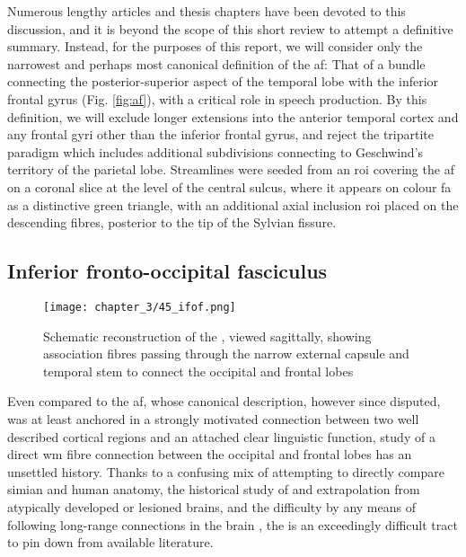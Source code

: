 Numerous lengthy articles and thesis chapters have been devoted to this discussion, and it is beyond the scope of this short review to attempt a definitive summary.
Instead, for the purposes of this report, we will consider only the narrowest and perhaps most canonical definition of the \gls{af}:
That of a bundle connecting the posterior-superior aspect of the temporal lobe with the inferior frontal gyrus (Fig. \ref{fig:af}), with a critical role in speech production\autocite{Baldo2015}.
By this definition, we will exclude longer extensions into the anterior temporal cortex\autocite{Giampiccolo2022a} and any frontal gyri other than the inferior frontal gyrus, and reject the tripartite paradigm which includes additional subdivisions connecting to Geschwind's territory of the parietal lobe\autocite{Catani2005,Martino2013a}.
Streamlines were seeded from an \gls{roi} covering the \gls{af} on a coronal slice at the level of the central sulcus, where it appears on colour \gls{fa} as a distinctive green triangle, with an additional axial inclusion \gls{roi} placed on the descending fibres, posterior to the tip of the Sylvian fissure.


\subsection{Inferior fronto-occipital fasciculus}


\begin{SCfigure}[][hbt!]
  \texttt{[image: chapter\_3/45\_ifof.png]}
  \caption[Inferior fronto-occipital fasciculus]{Schematic reconstruction of the , viewed sagittally, showing association fibres passing through the narrow external capsule and temporal stem to connect the occipital and frontal lobes}
  \label{fig:ifof}
\end{SCfigure}

Even compared to the \gls{af}, whose canonical description, however since disputed, was at least anchored in a strongly motivated connection between two well described cortical regions and an attached clear linguistic function, study of a direct \gls{wm} fibre connection between the occipital and frontal lobes has an unsettled history\autocite{Forkel2014a}.
Thanks to a confusing mix of attempting to directly compare simian and human anatomy\autocite{Schmahmann2007,ThiebautdeSchotten2012,Mandonnet2018,Sarubbo2019}, the historical study of and extrapolation from atypically developed or lesioned brains\autocite{Schmahmann2007,Forkel2014a}, and the difficulty by any means of following long-range connections in the brain
\autocite{Martino2010}, the  is an exceedingly difficult tract to pin down from available literature\autocite{Sarubbo2019,Weiller2021}.

